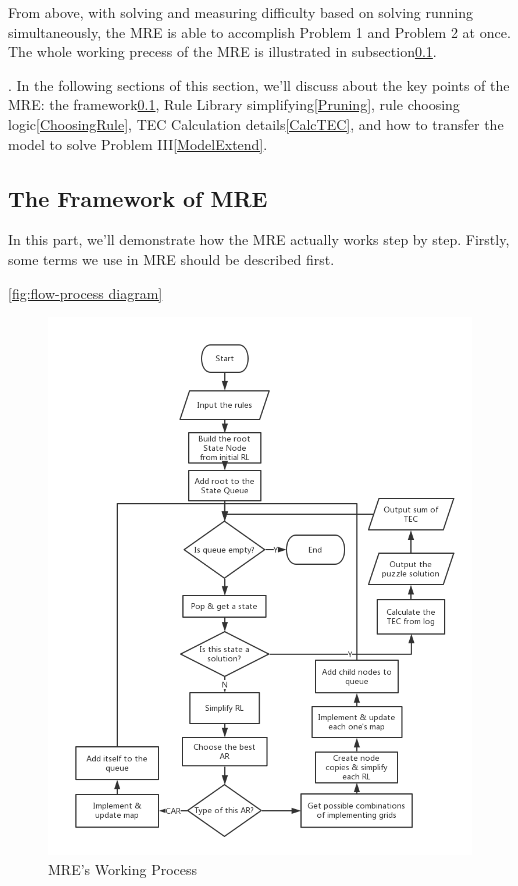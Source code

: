 From above, with solving and measuring difficulty based on solving running simultaneously, the MRE is able to accomplish Problem 1 and Problem 2 at once. The whole working precess of the MRE is illustrated in subsection\ref{ModelFramework}.

. In the following sections of this section, we'll discuss about the key points of the MRE: the framework\ref{ModelFramework}, Rule Library simplifying\ref{Pruning}, rule choosing logic\ref{ChoosingRule}, TEC Calculation details\ref{CalcTEC}, and how to transfer the model to solve Problem III\ref{ModelExtend}.

\subsection{The Framework of MRE}\label{ModelFramework}

In this part, we'll demonstrate how the MRE actually works step by step. Firstly, some terms we use in MRE should be described first.

\ref{fig:flow-process diagram}
\begin{figure}[htb]
	\centering
	\includegraphics[width=0.7\linewidth]{Figures/MRE Process.png}
	\caption{MRE's Working Process}
	\label{MRE Process}
\end{figure}
